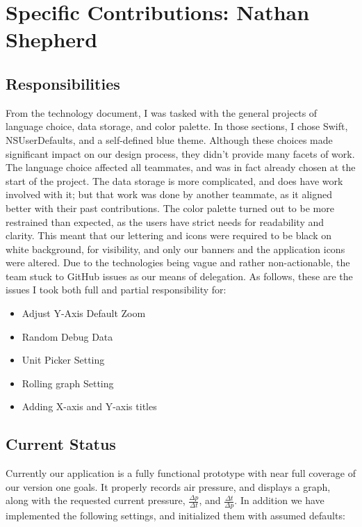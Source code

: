 \documentclass[onecolumn, draftclsnofoot,10pt, compsoc]{IEEEtran}
\begin{document}
\section{Specific Contributions: Nathan Shepherd}

\subsection{Responsibilities}

From the technology document, I was tasked with the general projects of language choice, data storage, and color palette.
In those sections, I chose Swift, NSUserDefaults, and a self-defined blue theme.
Although these choices made significant impact on our design process, they didn't provide many facets of work.
The language choice affected all teammates, and was in fact already chosen at the start of the project.
The data storage is more complicated, and does have work involved with it; but that work was done by another teammate, as it aligned better with their past contributions.
The color palette turned out to be more restrained than expected, as the users have strict needs for readability and clarity.
This meant that our lettering and icons were required to be black on white background, for visibility, and only our banners and the application icons were altered.
Due to the technologies being vague and rather non-actionable, the team stuck to GitHub issues as our means of delegation.
As follows, these are the issues I took both full and partial responsibility for:

\begin{itemize}
  \item Adjust Y-Axis Default Zoom
  \item Random Debug Data
  \item Unit Picker Setting
  \item Rolling graph Setting
  \item Adding X-axis and Y-axis titles
\end{itemize}

\subsection{Current Status}

Currently our application is a fully functional prototype with near full coverage of our version one goals.
It properly records air pressure, and displays a graph, along with the requested current pressure, $\frac{\Delta p}{\Delta t}$, and $\frac{\Delta t}{\Delta p}$.
In addition we have implemented the following settings, and initialized them with assumed defaults:
\end{document}
